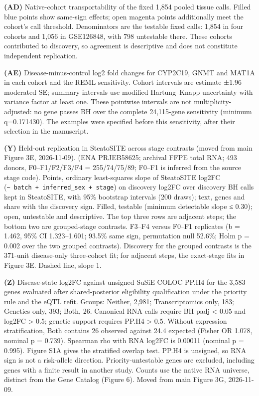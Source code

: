 \textbf{(AD)} Native-cohort transportability of the fixed
1,854 pooled tissue calls. Filled blue points show same-sign effects; open
magenta points additionally meet the cohort's call threshold. Denominators are
the testable fixed calls: 1,854 in four cohorts and 1,056 in GSE126848, with
798 untestable there. These cohorts contributed to discovery, so agreement is
descriptive and does not constitute independent replication.

\textbf{(AE)} Disease-minus-control log2 fold changes
for CYP2C19, GNMT and MAT1A in each cohort and the REML sensitivity. Cohort
intervals are estimate ±1.96 moderated SE; summary intervals use modified
Hartung--Knapp uncertainty with variance factor at least one. These pointwise
intervals are not multiplicity-adjusted: no gene passes BH over the complete
24,115-gene sensitivity (minimum q=0.171430). The examples were specified before
this sensitivity, after their selection in the manuscript.


\textbf{(Y)} Held-out replication in SteatoSITE across stage contrasts (moved from main Figure 3E, 2026-11-09). (ENA PRJEB58625; archival FFPE total RNA; 493 donors, F0--F1/F2/F3/F4 = 255/74/75/89; F0--F1 is inferred from the source stage code). Points, ordinary least-squares slope of SteatoSITE log2FC (\texttt{\textasciitilde{}\ batch\ +\ inferred\_\allowbreak{}sex\ +\ stage}) on discovery log2FC over discovery BH calls kept in SteatoSITE, with 95\% bootstrap intervals (200 draws); text, genes and share with the discovery sign. Filled, testable (minimum detectable slope ≤ 0.30); open, untestable and descriptive. The top three rows are adjacent steps; the bottom two are grouped-stage contrasts. F3--F4 versus F0--F1 replicates (b = 1.462, 95\% CI 1.323--1.601; 93.5\% same sign, permutation null 52.6\%; Holm p = 0.002 over the two grouped contrasts). Discovery for the grouped contrasts is the 371-unit disease-only three-cohort fit; for adjacent steps, the exact-stage fits in Figure 3E. Dashed line, slope 1.

\textbf{(Z)} Disease-state log2FC against unsigned SuSiE COLOC PP.H4 for the 3,583 genes evaluated after shared-posterior eligibility qualification under the priority rule and the eQTL refit. Groups: Neither, 2,981; Transcriptomics only, 183; Genetics only, 393; Both, 26. Canonical RNA calls require BH padj \textless{} 0.05 and \textbar log2FC\textbar{} \textgreater{} 0.5; genetic support requires PP.H4 \textgreater{} 0.5. Without expression stratification, Both contains 26 observed against 24.4 expected (Fisher OR 1.078, nominal p = 0.739). Spearman rho with \textbar RNA log2FC\textbar{} is 0.00011 (nominal p = 0.995). Figure S1A gives the stratified overlap test. PP.H4 is unsigned, so RNA sign is not a risk-allele direction. Priority-untestable genes are excluded, including genes with a finite result in another study. Counts use the native RNA universe, distinct from the Gene Catalog (Figure 6). Moved from main Figure 3G, 2026-11-09.

